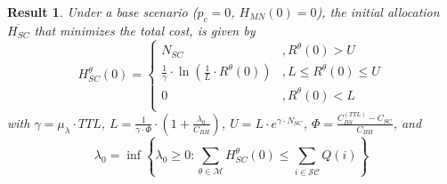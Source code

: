 \documentclass[10pt,conference,letterpaper]{IEEEtran}
\newtheorem{result}{Result}
\begin{document}
\begin{result}\label{THM:OPTIMAL-H0-NO-COOP-MULTIPLE}
Under a base scenario ($p_{c}=0$, $H_{MN}(0)=0$), the initial allocation $\overline{H_{SC}}$ that minimizes the total cost, is given by
\begin{equation*}
 H_{SC}^{\theta}(0) = \left\{
 \begin{array}{lc}
  N_{SC}& ,  R^{\theta}(0)>  U\\
 \frac{1}{\gamma}\cdot\ln\left(\frac{1}{L}\cdot R^{\theta}(0)\right)& , L\leq R^{\theta}(0)\leq U\\
  0		& , R^{\theta}(0)< L\\
 \end{array}
 \right.
 \end{equation*}
with  $\gamma = \mu_{\lambda}\cdot TTL$, $L = \frac{1}{\gamma\cdot\Phi}\cdot \left(1+\frac{\lambda_{0}}{C_{BH}}\right)$, $U =L\cdot e^{\gamma\cdot N_{SC}}$, $\Phi = \frac{C_{BS}^{(TTL)}-C_{SC}}{C_{BH}}$, and 
\begin{equation*}
\lambda_{0} = \inf \left\{\lambda_{0}\geq 0: \sum_{\theta\in\mathcal{M}} H_{SC}^{\theta}(0)\leq\sum_{i\in\mathcal{SC}} Q(i)\right\}
\end{equation*}
\end{result}
\end{document}
